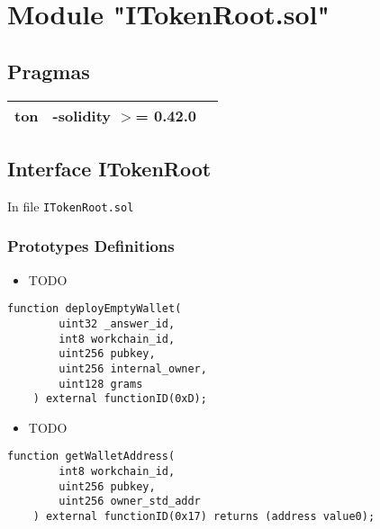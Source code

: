 
\section{Module "ITokenRoot.sol"}


\subsection{Pragmas}


\noindent\begin{tabular}{|l|l|p{5cm}|}\hline
ton & -solidity $>$= 0.42.0 &\\\hline
\end{tabular}


\subsection{Interface ITokenRoot}

\minitoc

In file {\tt ITokenRoot.sol}

\subsubsection{Prototypes Definitions}

\begin{itemize}
\item TODO
\end{itemize}

\begin{lstlisting}[firstnumber=4]
    function deployEmptyWallet(
        uint32 _answer_id,
        int8 workchain_id,
        uint256 pubkey,
        uint256 internal_owner,
        uint128 grams
    ) external functionID(0xD);
\end{lstlisting}
\begin{itemize}
\item TODO
\end{itemize}

\begin{lstlisting}[firstnumber=12]
    function getWalletAddress(
        int8 workchain_id,
        uint256 pubkey,
        uint256 owner_std_addr
    ) external functionID(0x17) returns (address value0);
\end{lstlisting}
